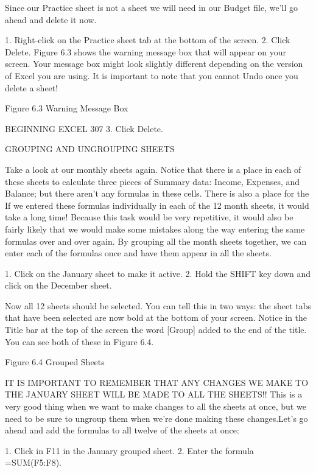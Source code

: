 Since our Practice sheet is not a sheet we will need in our Budget file, we’ll go ahead and delete it now.

1. Right-click on the Practice sheet tab at the bottom of the screen.
2. Click Delete. Figure 6.3 shows the warning message box that will appear on your screen. Your
message box might look slightly different depending on the version of Excel you are using. It is
important to note that you cannot Undo once you delete a sheet!




Figure 6.3 Warning Message Box

BEGINNING EXCEL 307
3. Click Delete.

GROUPING AND UNGROUPING SHEETS

Take a look at our monthly sheets again. Notice that there is a place in each of these sheets to calculate
three pieces of Summary data: Income, Expenses, and Balance; but there aren’t any formulas in these
cells. There is also a place for the %
If we entered these formulas individually in each of the 12 month sheets, it would take a long time!
Because this task would be very repetitive, it would also be fairly likely that we would make some
mistakes along the way entering the same formulas over and over again. By grouping all the month
sheets together, we can enter each of the formulas once and have them appear in all the sheets.

1. Click on the January sheet to make it active.
2. Hold the SHIFT key down and click on the December sheet.

Now all 12 sheets should be selected. You can tell this in two ways: the sheet tabs that have been
selected are now bold at the bottom of your screen. Notice in the Title bar at the top of the screen the
word [Group] added to the end of the title. You can see both of these in Figure 6.4.




Figure 6.4 Grouped Sheets


IT IS IMPORTANT TO REMEMBER THAT ANY CHANGES WE MAKE TO THE JANUARY
SHEET WILL BE MADE TO ALL THE SHEETS!! This is a very good thing when we want to make
changes to all the sheets at once, but we need to be sure to ungroup them when we’re done making
these changes.Let’s go ahead and add the formulas to all twelve of the sheets at once:

1. Click in F11 in the January grouped sheet.
2. Enter the formula =SUM(F5:F8).

